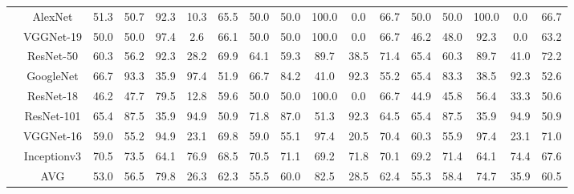\documentclass[12pt,italian]{article}
\begin{document}
\begin{tiny}
\begin{longtable}{lcccccccccccccccc}
& AlexNet & 51.3 & 50.7 & 92.3 & 10.3 & 65.5 & 50.0 & 50.0 & 100.0 &  0.0 & 66.7 & 50.0 & 50.0 & 100.0 &  0.0 & 66.7 \\ 
& VGGNet-19 & 50.0 & 50.0 & 97.4 &  2.6 & 66.1 & 50.0 & 50.0 & 100.0 &  0.0 & 66.7 & 46.2 & 48.0 & 92.3 &  0.0 & 63.2 \\ 
& ResNet-50 & 60.3 & 56.2 & 92.3 & 28.2 & 69.9 & 64.1 & 59.3 & 89.7 & 38.5 & 71.4 & 65.4 & 60.3 & 89.7 & 41.0 & 72.2 \\ 
& GoogleNet & 66.7 & 93.3 & 35.9 & 97.4 & 51.9 & 66.7 & 84.2 & 41.0 & 92.3 & 55.2 & 65.4 & 83.3 & 38.5 & 92.3 & 52.6 \\ 
& ResNet-18 & 46.2 & 47.7 & 79.5 & 12.8 & 59.6 & 50.0 & 50.0 & 100.0 &  0.0 & 66.7 & 44.9 & 45.8 & 56.4 & 33.3 & 50.6 \\ 
& ResNet-101 & 65.4 & 87.5 & 35.9 & 94.9 & 50.9 & 71.8 & 87.0 & 51.3 & 92.3 & 64.5 & 65.4 & 87.5 & 35.9 & 94.9 & 50.9 \\ 
& VGGNet-16 & 59.0 & 55.2 & 94.9 & 23.1 & 69.8 & 59.0 & 55.1 & 97.4 & 20.5 & 70.4 & 60.3 & 55.9 & 97.4 & 23.1 & 71.0 \\ 
& Inceptionv3 & 70.5 & 73.5 & 64.1 & 76.9 & 68.5 & 70.5 & 71.1 & 69.2 & 71.8 & 70.1 & 69.2 & 71.4 & 64.1 & 74.4 & 67.6 \\ 
\hline
& AVG & 53.0 & 56.5 & 79.8 & 26.3 & 62.3 & 55.5 & 60.0 & 82.5 & 28.5 & 62.4 & 55.3 & 58.4 & 74.7 & 35.9 & 60.5 \\ 
\hline
\bottomrule
\end{longtable} 

 \pagebreak 
\end{tiny} 
 
\end{document}
